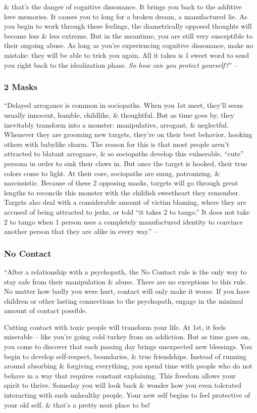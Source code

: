 \documentclass{article}
\numberwithin{equation}{section}
\begin{document}
\& that's the danger of cognitive dissonance. It brings you back to the additive love memories. It causes you to long for a broken dream, a manufactured lie. As you begin to work through these feelings, the diametrically opposed thoughts will become less \& less extreme. But in the meantime, you are still very susceptible to their ongoing abuse. As long as you're experiencing cognitive dissonance, make no mistake: they will be able to trick you again. All it takes is 1 sweet word to send you right back to the idealization phase. \textit{So how can you protect yourself?}'' -- \cite[pp. 100--101]{MacKenzie2015}

\subsubsection{2 Masks}
``Delayed arrogance is common in sociopaths. When you 1st meet, they'll seem usually innocent, humble, childlike, \& thoughtful. But as time goes by, they inevitably transform into a monster: manipulative, arrogant, \& neglectful. Whenever they are grooming new targets, they're on their best behavior, hooking others with babylike charm. The reason for this is that most people aren't attracted to blatant arrogance, \& so sociopaths develop this vulnerable, ``cute'' persona in order to sink their claws in. But once the target is hooked, their true colors come to light. At their core, sociopaths are smug, patronizing, \& narcissistic. Because of these 2 opposing masks, targets will go through great lengths to reconcile this monster with the childish sweetheart they remember. Targets also deal with a considerable amount of victim blaming, where they are accused of being attracted to jerks, or told ``it takes 2 to tango.'' It does not take 2 to tango when 1 person uses a completely manufactured identity to convince another person that they are alike in every way.'' -- \cite[pp. 101--102]{MacKenzie2015}

\subsubsection{No Contact}
``After a relationship with a psychopath, the No Contact rule is the only way to stay safe from their manipulation \& abuse. There are no exceptions to this rule. No matter how badly you were hurt, contact will only make it worse. If you have children or other lasting connections to the psychopath, engage in the minimal amount of contact possible.

Cutting contact with toxic people will transform your life. At 1st, it feels miserable -- like you're going cold turkey from an addiction. But as time goes on, you come to discover that each passing day brings unexpected new blessings. You begin to develop self-respect, boundaries, \& true friendships. Instead of running around absorbing \& forgiving everything, you spend time with people who do not behave in a way that requires constant explaining. This freedom allows your spirit to thrive. Someday you will look back \& wonder how you even tolerated interacting with such unhealthy people. Your new self begins to feel protective of your old self, \& that's a pretty neat place to be!
\end{document}
